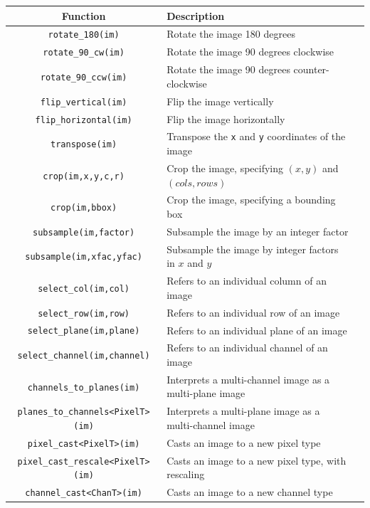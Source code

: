 \begin{table}[t]\begin{centering}
\begin{tabular}{|c|l|l|} \hline
Function & Description \\ \hline \hline
\verb#rotate_180(im)# & Rotate the image 180 degrees \\ \hline
\verb#rotate_90_cw(im)# & Rotate the image 90 degrees clockwise \\ \hline
\verb#rotate_90_ccw(im)# & Rotate the image 90 degrees counter-clockwise \\ \hline
\verb#flip_vertical(im)# & Flip the image vertically \\ \hline
\verb#flip_horizontal(im)# & Flip the image horizontally \\ \hline
\verb#transpose(im)# & Transpose the \verb#x# and \verb#y# coordinates of the image \\ \hline
\verb#crop(im,x,y,c,r)# & Crop the image, specifying $(x,y)$ and $(cols,rows)$ \\ \hline
\verb#crop(im,bbox)# & Crop the image, specifying a bounding box \\ \hline
\verb#subsample(im,factor)# & Subsample the image by an integer factor \\ \hline
\verb#subsample(im,xfac,yfac)# & Subsample the image by integer factors in $x$ and $y$ \\ \hline
\verb#select_col(im,col)# & Refers to an individual column of an image \\ \hline
\verb#select_row(im,row)# & Refers to an individual row of an image \\ \hline
\verb#select_plane(im,plane)# & Refers to an individual plane of an image \\ \hline
\verb#select_channel(im,channel)# & Refers to an individual channel of an image \\ \hline
\verb#channels_to_planes(im)# & Interprets a multi-channel image as a multi-plane image \\ \hline
\hline
\verb#planes_to_channels<PixelT>(im)# & Interprets a multi-plane image as a multi-channel image \\ \hline
\verb#pixel_cast<PixelT>(im)# & Casts an image to a new pixel type \\ \hline
\verb#pixel_cast_rescale<PixelT>(im)# & Casts an image to a new pixel type, with rescaling \\ \hline
\verb#channel_cast<ChanT>(im)# & Casts an image to a new channel type \\ \hline

\end{tabular}
\end{centering}
\end{table}

